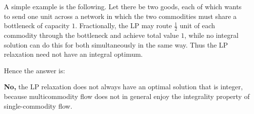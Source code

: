 \documentclass[letterpaper]{article}
\begin{document}
\begin{enumerate}
			\medskip
			
			A simple example is the following. Let there be two goods, each of which wants to
			send one unit across a network in which the two commodities must share a bottleneck
			of capacity $1$. Fractionally, the LP may route $\tfrac12$ unit of each commodity
			through the bottleneck and achieve total value $1$, while no integral solution can
			do this for both simultaneously in the same way. Thus the LP relaxation need not
			have an integral optimum.
			
			Hence the answer is:
			
			\medskip
			
			\textbf{No,} the LP relaxation does not always have an optimal solution that is
			integer, because multicommodity flow does not in general enjoy the integrality
			property of single-commodity flow.
		\end{enumerate}
	
		
		
	
\end{document}
